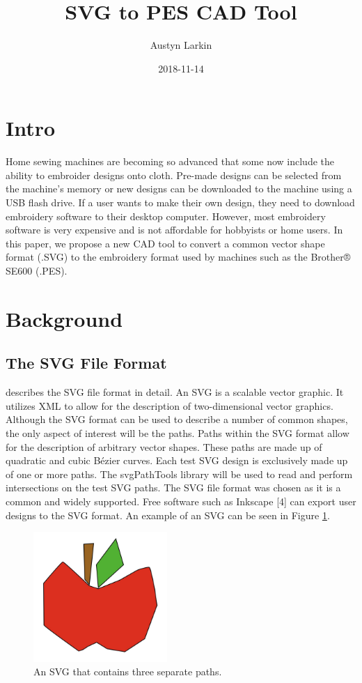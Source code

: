 \documentclass{article}
\title{SVG to PES CAD Tool}
\author{Austyn Larkin}
\date{2018-11-14}
\begin{document}
\maketitle
\section{Intro}
Home sewing machines are becoming so advanced that some now include the ability to embroider designs onto cloth. Pre-made designs can be selected from the machine's memory or new designs can be downloaded to the machine using a USB flash drive. If a user wants to make their own design, they need to download embroidery software to their desktop computer. However, most embroidery software is very expensive and is not affordable for hobbyists or home users. In this paper, we propose a new CAD tool to convert a common vector shape format (.SVG) to the embroidery format used by machines such as the Brother® SE600 (.PES).

\section{Background}

\subsection{The SVG File Format}

\cite{SVGFormat} describes the SVG file format in detail. An SVG is a scalable vector graphic. It utilizes XML to allow for the description of two-dimensional vector graphics. Although the SVG format can be used to describe a number of common shapes, the only aspect of interest will be the paths. Paths within the SVG format allow for the description of arbitrary vector shapes. These paths are made up of quadratic and cubic Bézier curves. Each test SVG design is exclusively made up of one or more paths. The svgPathTools library \cite{svgpathtools} will be used to read and perform intersections on the test SVG paths. The SVG file format was chosen as it is a common and widely supported. Free software such as Inkscape [4] can export user designs to the SVG format. An example of an SVG can be seen in Figure \ref{appleExample}.

\begin{figure}[H]
    \centering
    \includegraphics[width=2in]{SVGExample}
    \caption{An SVG that contains three separate paths.}
    \label{appleExample}
\end{figure}
\end{document}
